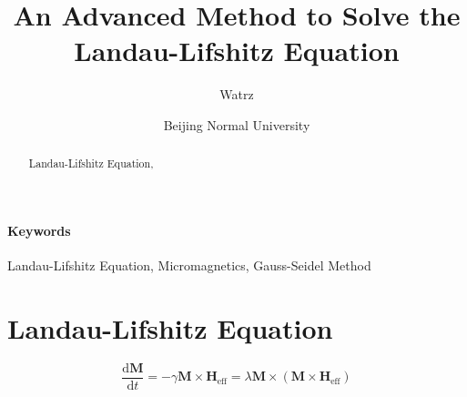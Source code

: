 \documentclass{article}
\renewcommand{\d}[2]{\frac{\text{d} #1}{\text{d} #2}} %
\begin{document}
\title{An Advanced Method to Solve the Landau-Lifshitz Equation}
\author{Watrz}
\date{Beijing Normal University}
\maketitle


\begin{abstract}
Landau-Lifshitz Equation,
\end{abstract}
\paragraph{Keywords} Landau-Lifshitz Equation, Micromagnetics, Gauss-Seidel Method


\section{Landau-Lifshitz Equation}
\begin{equation}
\d{\bm{M}}{t}=-\gamma \bm{M}\times \bm{H}_\text{eff}=\lambda \bm{M}\times \left(\bm{M}\times\bm{H}_\text{eff}\right)
\end{equation}
\end{document}
